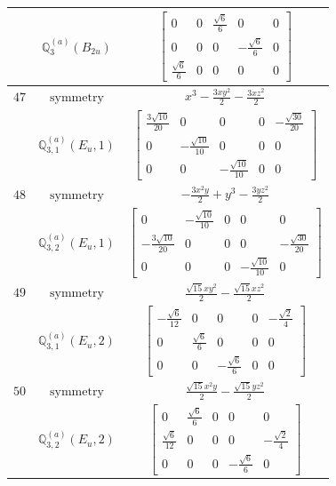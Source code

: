 \documentclass[fleqn,8pt,landscape]{jsarticle}
\begin{document}
\begin{longtable}{ccc}
$  $ & $ \mathbb{Q}_{3}^{(a)}(B_{2u}) $ & $ \begin{bmatrix} 0 & 0 & \frac{\sqrt{6}}{6} & 0 & 0 \\ 0 & 0 & 0 & - \frac{\sqrt{6}}{6} & 0 \\ \frac{\sqrt{6}}{6} & 0 & 0 & 0 & 0 \end{bmatrix} $ \\ \hline
$ 47 $ & $ \text{symmetry} $ & $ x^{3} - \frac{3 x y^{2}}{2} - \frac{3 x z^{2}}{2} $ \\
$  $ & $ \mathbb{Q}_{3,1}^{(a)}(E_{u},1) $ & $ \begin{bmatrix} \frac{3 \sqrt{10}}{20} & 0 & 0 & 0 & - \frac{\sqrt{30}}{20} \\ 0 & - \frac{\sqrt{10}}{10} & 0 & 0 & 0 \\ 0 & 0 & - \frac{\sqrt{10}}{10} & 0 & 0 \end{bmatrix} $ \\ \hline
$ 48 $ & $ \text{symmetry} $ & $ - \frac{3 x^{2} y}{2} + y^{3} - \frac{3 y z^{2}}{2} $ \\
$  $ & $ \mathbb{Q}_{3,2}^{(a)}(E_{u},1) $ & $ \begin{bmatrix} 0 & - \frac{\sqrt{10}}{10} & 0 & 0 & 0 \\ - \frac{3 \sqrt{10}}{20} & 0 & 0 & 0 & - \frac{\sqrt{30}}{20} \\ 0 & 0 & 0 & - \frac{\sqrt{10}}{10} & 0 \end{bmatrix} $ \\ \hline
$ 49 $ & $ \text{symmetry} $ & $ \frac{\sqrt{15} x y^{2}}{2} - \frac{\sqrt{15} x z^{2}}{2} $ \\
$  $ & $ \mathbb{Q}_{3,1}^{(a)}(E_{u},2) $ & $ \begin{bmatrix} - \frac{\sqrt{6}}{12} & 0 & 0 & 0 & - \frac{\sqrt{2}}{4} \\ 0 & \frac{\sqrt{6}}{6} & 0 & 0 & 0 \\ 0 & 0 & - \frac{\sqrt{6}}{6} & 0 & 0 \end{bmatrix} $ \\ \hline
$ 50 $ & $ \text{symmetry} $ & $ \frac{\sqrt{15} x^{2} y}{2} - \frac{\sqrt{15} y z^{2}}{2} $ \\
$  $ & $ \mathbb{Q}_{3,2}^{(a)}(E_{u},2) $ & $ \begin{bmatrix} 0 & \frac{\sqrt{6}}{6} & 0 & 0 & 0 \\ \frac{\sqrt{6}}{12} & 0 & 0 & 0 & - \frac{\sqrt{2}}{4} \\ 0 & 0 & 0 & - \frac{\sqrt{6}}{6} & 0 \end{bmatrix} $ \\ \hline

\end{longtable}
\end{document}
